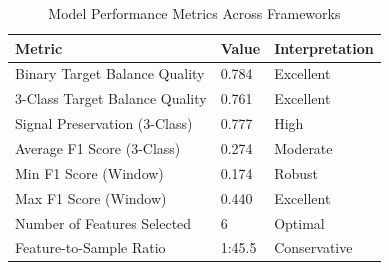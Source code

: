 \begin{table}
\caption{Model Performance Metrics Across Frameworks}
\label{tab:model_performance}
\begin{tabular}{lll}
\toprule
Metric & Value & Interpretation \\
\midrule
Binary Target Balance Quality & 0.784 & Excellent \\
3-Class Target Balance Quality & 0.761 & Excellent \\
Signal Preservation (3-Class) & 0.777 & High \\
Average F1 Score (3-Class) & 0.274 & Moderate \\
Min F1 Score (Window) & 0.174 & Robust \\
Max F1 Score (Window) & 0.440 & Excellent \\
Number of Features Selected & 6 & Optimal \\
Feature-to-Sample Ratio & 1:45.5 & Conservative \\
\bottomrule
\end{tabular}
\end{table}
